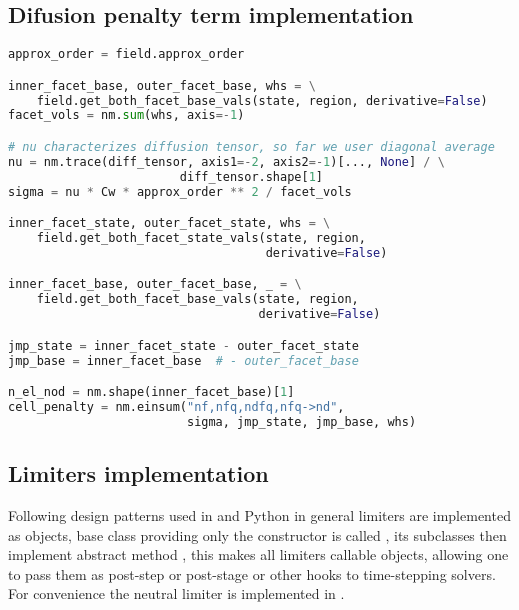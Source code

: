 \subsection{Difusion penalty term implementation}
\label{se:diff_penal_term_imp}
\setcounter{lstannotation}{0}
\begin{lstlisting}[language=Python, caption=Computation of penalty cell 
fluxes]
approx_order = field.approx_order

inner_facet_base, outer_facet_base, whs = \
    field.get_both_facet_base_vals(state, region, derivative=False)
facet_vols = nm.sum(whs, axis=-1)

# nu characterizes diffusion tensor, so far we user diagonal average
nu = nm.trace(diff_tensor, axis1=-2, axis2=-1)[..., None] / \
                        diff_tensor.shape[1]
sigma = nu * Cw * approx_order ** 2 / facet_vols

inner_facet_state, outer_facet_state, whs = \
    field.get_both_facet_state_vals(state, region, 
                                    derivative=False)

inner_facet_base, outer_facet_base, _ = \
    field.get_both_facet_base_vals(state, region, 
                                   derivative=False)

jmp_state = inner_facet_state - outer_facet_state
jmp_base = inner_facet_base  # - outer_facet_base

n_el_nod = nm.shape(inner_facet_base)[1]
cell_penalty = nm.einsum("nf,nfq,ndfq,nfq->nd",
                         sigma, jmp_state, jmp_base, whs)

\end{lstlisting}

\subsection{Limiters implementation}
Following design patterns used in \sfepy{} and Python in general limiters are 
implemented as objects, base class providing only the constructor is called , its 
subclasses then implement abstract method , this makes all limiters callable 
objects, allowing one to pass them as post-step or post-stage or other hooks to time-stepping 
solvers. For convenience the neutral limiter is implemented in .

